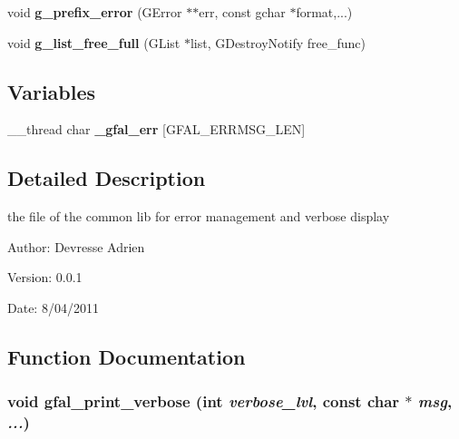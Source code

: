 \begin{CompactItemize}
\item 
void \textbf{g\_\-prefix\_\-error} (GError $\ast$$\ast$err, const gchar $\ast$format,...)\label{gfal__common__errverbose_8c_0c7cc2a68d8e7b0bed51a834aa54fa0d}

\item 
void \textbf{g\_\-list\_\-free\_\-full} (GList $\ast$list, GDestroy\-Notify free\_\-func)\label{gfal__common__errverbose_8c_0d507092f75c2411862d210dbecbc4e5}

\end{CompactItemize}
\subsection*{Variables}
\begin{CompactItemize}
\item 
\_\-\_\-thread char \textbf{\_\-gfal\_\-err} [GFAL\_\-ERRMSG\_\-LEN]\label{gfal__common__errverbose_8c_e2d33dc17390b0f831960c3682469046}

\end{CompactItemize}


\subsection{Detailed Description}
the file of the common lib for error management and verbose display 

\begin{Desc}
\item[Author:]Devresse Adrien \end{Desc}
\begin{Desc}
\item[Version:]0.0.1 \end{Desc}
\begin{Desc}
\item[Date:]8/04/2011 \end{Desc}


\subsection{Function Documentation}
\subsubsection{\setlength{\rightskip}{0pt plus 5cm}void gfal\_\-print\_\-verbose (int {\em verbose\_\-lvl}, const char $\ast$ {\em msg},  {\em ...})}\label{gfal__common__errverbose_8c_8b05640b4b43a776603bd93703c29d30}



